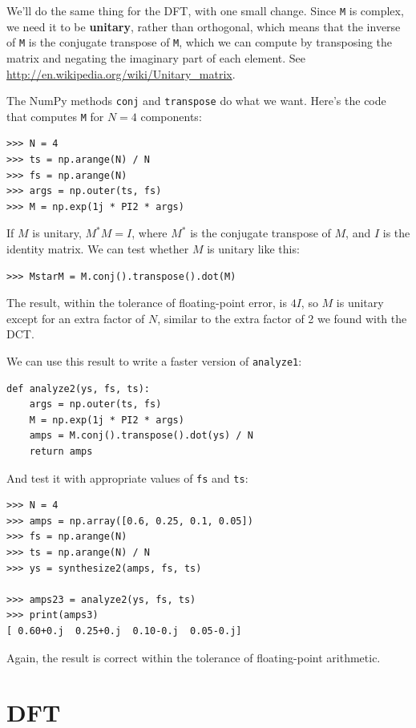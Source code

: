\documentclass[12pt]{book}
\begin{document}
We'll do the same thing for the DFT, with one small change.
Since {\tt M} is complex, we need it to be {\bf unitary}, rather
than orthogonal, which means that the inverse of {\tt M} is
the conjugate transpose of {\tt M}, which we can compute by
transposing the matrix and negating the imaginary part of each
element.  See \url{http://en.wikipedia.org/wiki/Unitary_matrix}. 

The NumPy methods {\tt conj} and {\tt transpose} do what we
want.  Here's the code that computes {\tt M} for $N=4$ components:

\begin{verbatim}
>>> N = 4
>>> ts = np.arange(N) / N
>>> fs = np.arange(N)
>>> args = np.outer(ts, fs)
>>> M = np.exp(1j * PI2 * args)
\end{verbatim}

If $M$ is unitary, $M^*M = I$, where $M^*$ is the conjugate transpose
of $M$, and $I$ is the identity matrix.  We can test whether $M$
is unitary like this:

\begin{verbatim}
>>> MstarM = M.conj().transpose().dot(M)
\end{verbatim}

The result, within the tolerance of floating-point error, is
$4 I$, so $M$ is unitary except for an extra factor of $N$,
similar to the extra factor of 2 we found with the DCT.

We can use this result to write a faster version of {\tt analyze1}:

\begin{verbatim}
def analyze2(ys, fs, ts):
    args = np.outer(ts, fs)
    M = np.exp(1j * PI2 * args)
    amps = M.conj().transpose().dot(ys) / N
    return amps
\end{verbatim}

And test it with appropriate values of {\tt fs} and {\tt ts}:

\begin{verbatim}
>>> N = 4
>>> amps = np.array([0.6, 0.25, 0.1, 0.05])
>>> fs = np.arange(N)
>>> ts = np.arange(N) / N
>>> ys = synthesize2(amps, fs, ts)

>>> amps23 = analyze2(ys, fs, ts)
>>> print(amps3)
[ 0.60+0.j  0.25+0.j  0.10-0.j  0.05-0.j]
\end{verbatim}

Again, the result is correct within the tolerance of floating-point
arithmetic.


\section{DFT}
\label{dftsection}
\end{document}
